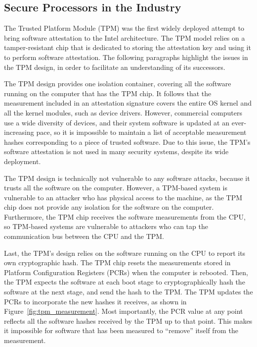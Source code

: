 \subsection{Secure Processors in the Industry}

The Trusted Platform Module (TPM) \cite{grawrock2003tpm} was the first widely
deployed attempt to bring software attestation to the Intel architecture. The
TPM model relies on a tamper-resistant chip that is dedicated to storing the
attestation key and using it to perform software attestation. The following
paragraphs highlight the issues in the TPM design, in order to facilitate an
understanding of its successors.

The TPM design provides one isolation container, covering all the software
running on the computer that has the TPM chip. It follows that the measurement
included in an attestation signature covers the entire OS kernel and all the
kernel modules, such as device drivers. However, commercial computers use a
wide diversity of devices, and their system software is updated at an
ever-increasing pace, so it is impossible to maintain a list of acceptable
measurement hashes corresponding to a piece of trusted software. Due to this
issue, the TPM's software attestation is not used in many security systems,
despite its wide deployment.

The TPM design is technically not vulnerable to any software attacks, because
it trusts all the software on the computer. However, a TPM-based system is
vulnerable to an attacker who has physical access to the machine, as the TPM
chip does not provide any isolation for the software on the computer.
Furthermore, the TPM chip receives the software measurements from the CPU,
so TPM-based systems are vulnerable to attackers who can tap the communication
bus between the CPU and the TPM.

Last, the TPM's design relies on the software running on the CPU to report its
own cryptographic hash. The TPM chip resets the measurements stored in Platform
Configuration Registers (PCRs) when the computer is rebooted. Then, the TPM
expects the software at each boot stage to cryptographically hash the software
at the next stage, and send the hash to the TPM. The TPM updates the PCRs to
incorporate the new hashes it receives, as shown in
Figure~\ref{fig:tpm_measurement}. Most importantly, the PCR value at any point
reflects all the software hashes received by the TPM up to that point. This
makes it impossible for software that has been measured to ``remove'' itself
from the measurement.

